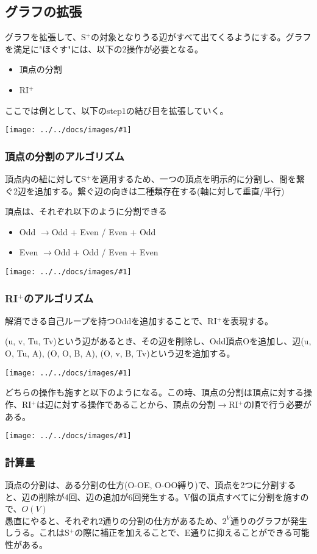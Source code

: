 \documentclass[11pt,a4j]{jarticle}
\newcommand{\splus}{S${}^\text{+}$}
\newcommand{\riplus}{RI${}^\text{+}$}
\newcommand{\image}[1]{\begin{center}\texttt{[image: ../../docs/images/\#1]}\end{center}}
\newcommand{\ra }{$\rightarrow$}
\begin{document}
\subsection{グラフの拡張}
グラフを拡張して、\splus の対象となりうる辺がすべて出てくるようにする。グラフを満足に"ほぐす"には、以下の2操作が必要となる。
\begin{itemize}
    \item 頂点の分割
    \item \riplus
\end{itemize}

ここでは例として、以下のstep1の結び目を拡張していく。
\image{extend_default.jpg}

\subsubsection{頂点の分割のアルゴリズム}
頂点内の紐に対して\splus を適用するため、一つの頂点を明示的に分割し、間を繋ぐ2辺を追加する。繋ぐ辺の向きは二種類存在する(軸に対して垂直/平行)

頂点は、それぞれ以下のように分割できる
\begin{itemize}
    \item Odd \ra  Odd + Even / Even + Odd
    \item Even \ra  Odd + Odd / Even + Even
\end{itemize}

\image{extend_split.jpg}

\subsubsection{\riplus のアルゴリズム}
解消できる自己ループを持つOddを追加することで、\riplus を表現する。

(u, v, Tu, Tv)という辺があるとき、その辺を削除し、Odd頂点Oを追加し、辺(u, O, Tu, A), (O, O, B, A), (O, v, B, Tv)という辺を追加する。

\image{extend_riplus.jpg}

どちらの操作も施すと以下のようになる。この時、頂点の分割は頂点に対する操作、\riplus は辺に対する操作であることから、頂点の分割\ra \riplus の順で行う必要がある。
\image{extend_total.jpg}

\subsubsection{計算量}
頂点の分割は、ある分割の仕方(O-OE, O-OO縛り)で、頂点を2つに分割すると、辺の削除が4回、辺の追加が6回発生する。V個の頂点すべてに分割を施すので、$O(V)$\\
愚直にやると、それぞれ2通りの分割の仕方があるため、$2^V$通りのグラフが発生しうる。これは\splus の際に補正を加えることで、E通りに抑えることができる可能性がある。
\end{document}

